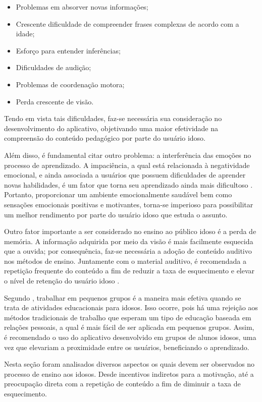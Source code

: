\begin{itemize}
    \item Problemas em absorver novas informações;
    \item Crescente dificuldade de compreender frases complexas de acordo com a idade;
    \item Esforço para entender inferências;
    \item Dificuldades de audição;
    \item Problemas de coordenação motora;
    \item Perda crescente de visão.
\end{itemize}

Tendo em vista tais dificuldades, faz-se necessária sua consideração no desenvolvimento do aplicativo, objetivando uma maior efetividade na compreensão do conteúdo pedagógico por parte do usuário idoso.

Além disso, é fundamental citar outro problema: a interferência das emoções no processo de aprendizado. A impaciência, a qual está relacionada à negatividade emocional, e ainda associada a usuários que possuem dificuldades de aprender novas habilidades, é um fator que torna seu aprendizado ainda mais dificultoso \citep{Edukacja}. Portanto, proporcionar um ambiente emocionalmente saudável bem como sensações emocionais positivas e motivantes, torna-se imperioso para possibilitar um melhor rendimento por parte do usuário idoso que estuda o assunto.

Outro fator importante a ser considerado no ensino ao público idoso é a perda de memória. A informação adquirida por meio da visão é mais facilmente esquecida que a ouvida; por consequência,  faz-se necessária a adoção de conteúdo auditivo nos métodos de ensino. Juntamente com o material auditivo, é recomendada a repetição frequente do conteúdo a fim de reduzir a taxa de esquecimento e elevar o nível de retenção do usuário idoso \citep{euromed}.

Segundo \cite{Edukacja}, trabalhar em pequenos grupos é a maneira mais efetiva quando se trata de atividades educacionais para idosos. Isso ocorre, pois há uma rejeição aos métodos tradicionais de trabalho que esperam um tipo de educação baseada em relações pessoais, a qual é mais fácil de ser aplicada em pequenos grupos. Assim, é recomendado o uso do aplicativo desenvolvido em grupos de alunos idosos, uma vez que elevariam a proximidade entre os usuários, beneficiando o aprendizado.

Nesta seção foram analisados diversos aspectos os quais devem ser observados no processo de ensino aos idosos. Desde incentivos indiretos para a motivação, até a preocupação direta com a repetição de conteúdo a fim de diminuir a taxa de esquecimento. 

